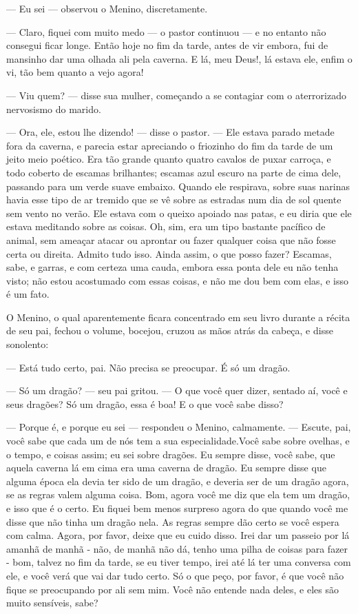 — Eu sei — observou o Menino, discretamente.

— Claro, fiquei com muito medo — o pastor continuou — e no entanto não
consegui ficar longe. Então hoje no fim da tarde, antes de vir
embora, fui de mansinho dar uma olhada ali pela caverna. E lá, meu
Deus!, lá estava ele, enfim o vi, tão bem quanto a vejo agora!

— Viu quem? — disse sua mulher, começando a se contagiar com o
aterrorizado nervosismo do marido.

— Ora, ele, estou lhe dizendo! — disse o pastor. — Ele estava parado
metade fora da caverna, e parecia estar apreciando o friozinho do fim
da tarde de um jeito meio poético. Era tão grande quanto quatro
cavalos de puxar carroça, e todo coberto de escamas brilhantes;
escamas azul escuro na parte de cima dele, passando para um verde
suave embaixo. Quando ele respirava, sobre suas narinas havia esse
tipo de ar tremido que se vê sobre as estradas num dia de sol quente
sem vento no verão. Ele estava com o queixo apoiado nas patas, e eu
diria que ele estava meditando sobre as coisas. Oh, sim, era um tipo
bastante pacífico de animal, sem ameaçar atacar ou aprontar ou fazer
qualquer coisa que não fosse certa ou direita. Admito tudo isso.
Ainda assim, o que posso fazer? Escamas, sabe, e garras, e com
certeza uma cauda, embora essa ponta dele eu não tenha visto; não
estou acostumado com essas coisas, e não me dou bem com elas, e isso
é um fato.

O Menino, o qual aparentemente ficara concentrado em seu livro durante
a récita de seu pai, fechou o volume, bocejou, cruzou as mãos atrás
da cabeça, e disse sonolento:

— Está tudo certo, pai. Não precisa se preocupar. É só um dragão.

— Só um dragão? — seu pai gritou. — O que você quer dizer, sentado aí,
você e seus dragões? Só um dragão, essa é boa! E o que você sabe
disso?

— Porque é, e porque eu sei — respondeu o Menino, calmamente. —
Escute, pai, você sabe que cada um de nós tem a sua
especialidade.Você sabe sobre ovelhas, e o tempo, e coisas assim; eu
sei sobre dragões. Eu sempre disse, você sabe, que aquela caverna lá
em cima era uma caverna de dragão. Eu sempre disse que alguma época
ela devia ter sido de um dragão, e deveria ser de um dragão agora, se
as regras valem alguma coisa. Bom, agora você me diz que ela tem um
dragão, e isso que é o certo. Eu fiquei bem menos surpreso agora do
que quando você me disse que não tinha um dragão nela. As regras
sempre dão certo se você espera com calma. Agora, por favor, deixe
que eu cuido disso. Irei dar um passeio por lá amanhã de manhã - não,
de manhã não dá, tenho uma pilha de coisas para fazer - bom, talvez
no fim da tarde, se eu tiver tempo, irei até lá ter uma conversa com
ele, e você verá que vai dar tudo certo. Só o que peço, por favor, é
que você não fique se preocupando por ali sem mim. Você não entende
nada deles, e eles são muito sensíveis, sabe?

